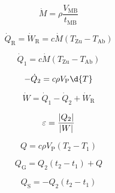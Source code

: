 \documentclass[a4paper]{scrartcl}
\begin{document}
	\begin{equation} %
		\dot{M} = \rho \frac{V_\text{MB}}{t_\text{MB}}
	\end{equation} %
	
	\begin{equation} %
		\dot{Q}_\text{R} = \dot{W}_\text{R} = c \dot{M} (T_\text{Zu} - T_\text{Ab})
	\end{equation} %
	
	\begin{equation} %
	\dot{Q}_1 = c \dot{M} (T_\text{Zu} - T_\text{Ab})
	\end{equation} %
	
	\begin{equation} %
		-\dot{Q}_2 = c \rho V_\text{P} \d{T}
	\end{equation} %
	
	\begin{equation} %
		\dot{W} = \dot{Q}_1 - \dot{Q}_2 + \dot{W}_\text{R}
	\end{equation} %
	
	\begin{equation} %
		\varepsilon = \frac{\abs{Q_2}}{\abs{W}}
	\end{equation} %
	
	\begin{equation} %
		Q = c \rho V_\text{P} (T_2 - T_1)
	\end{equation} %
	
	\begin{equation} %
		Q_\text{G} = Q_2 (t_2 - t_1) + Q
	\end{equation} %
	
	\begin{equation} %
		Q_\text{S} = -Q_2 (t_2 - t_1)
	\end{equation} %
\end{document}

